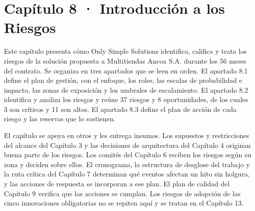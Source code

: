 \documentclass[11pt]{article}
\begin{document}
\let\ossOriginalSection\section
\renewcommand{\section}{\phantomsection\ossOriginalSection}
\let\ossOriginalSubsection\subsection
\renewcommand{\subsection}{\phantomsection\ossOriginalSubsection}
\let\ossOriginalSubsubsection\subsubsection
\renewcommand{\subsubsection}{\ossOriginalSubsubsection}
\section{Capítulo 8 · Introducción a los Riesgos}\label{capuxedtulo-8-introducciuxf3n-a-los-riesgos}

Este capítulo presenta cómo Only Simple Solutions identifica, califica y trata los riesgos de la solución propuesta a Multitiendas Ancoa S.A. durante los 56 meses del contrato. Se organiza en tres apartados que se leen en orden. El apartado 8.1 define el plan de gestión, con el enfoque, los roles, las escalas de probabilidad e impacto, las zonas de exposición y los umbrales de escalamiento. El apartado 8.2 identifica y analiza los riesgos y reúne 37 riesgos y 8 oportunidades, de los cuales 3 son críticos y 11 son altos. El apartado 8.3 define el plan de acción de cada riesgo y las reservas que lo sostienen.

El capítulo se apoya en otros y les entrega insumos. Los supuestos y restricciones del alcance del Capítulo 3 y las decisiones de arquitectura del Capítulo 4 originan buena parte de los riesgos. Los comités del Capítulo 6 reciben los riesgos según su zona y deciden sobre ellos. El cronograma, la estructura de desglose del trabajo y la ruta crítica del Capítulo 7 determinan qué eventos afectan un hito sin holgura, y las acciones de respuesta se incorporan a ese plan. El plan de calidad del Capítulo 9 verifica que las acciones se cumplan. Los riesgos de adopción de las cinco innovaciones obligatorias no se repiten aquí y se tratan en el Capítulo 13.
\end{document}
